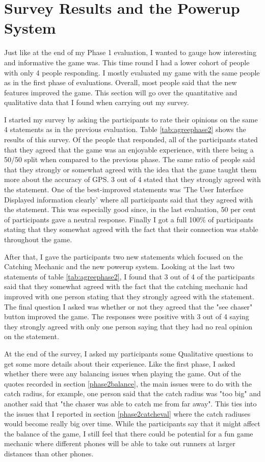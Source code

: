 \documentclass{l4proj}
\begin{document}
\section{Survey Results and the Powerup System}
Just like at the end of my Phase 1 evaluation, I wanted to gauge how interesting and informative the game was.
This time round I had a lower cohort of people with only 4 people responding. I mostly evaluated my game with
the same people as in the first phase of evaluations. Overall, most people said that the new features improved the
game. This section will go over the quantitative and qualitative data that I found when carrying out my survey.

I started my survey by asking the participants to rate their opinions on the same 4 statements as in the previous
evaluation. Table \ref{tab:agreephase2} shows the results of this survey. Of the people that responded, all of the participants stated that they agreed that the game was an
enjoyable experience, with there being a 50/50 split when compared to the previous phase. The same ratio
of people said that they strongly or somewhat agreed with the idea that the game taught them more about the accuracy
of GPS. 3 out of 4 stated that they strongly agreed with the statement. One of the best-improved statements was
'The User Interface Displayed information clearly' where all participants said that they agreed with the statement.
This was especially good since, in the last evaluation, 50 per cent of participants gave a neutral response. Finally
I got a full 100\% of participants stating that they somewhat agreed with the fact that their connection was stable
throughout the game.

After that, I gave the participants two new statements which focused on the Catching Mechanic and the new powerup
system. Looking at the last two statements of table \ref{tab:agreephase2}, I found that 3 out of 4 of the
participants said that they somewhat agreed with the fact that the catching mechanic had improved with one
person stating that they strongly agreed with the statement. The final question I asked was whether or not
they agreed that the "see chaser" button improved the game. The responses were positive with 3 out of 4
saying they strongly agreed with only one person saying that they had no real opinion on the statement.

At the end of the survey, I asked my participants some Qualitative questions to get some more details about
their experience. Like the first phase, I asked whether there were any balancing issues when playing the game.
Out of the quotes recorded in section \ref{phase2balance}, the main issues were to do with the catch radius,
for example, one person said that the catch radius was "too big" and another said that "the chaser was able to catch
me from far away". This ties into the issues that I reported in section \ref{phase2catcheval} where the catch
radiuses would become really big over time. While the participants say that it might affect the balance of the
game, I still feel that there could be potential for a fun game mechanic where different phones will be able
to take out runners at larger distances than other phones.
\end{document}
